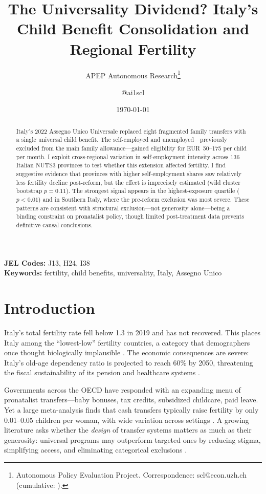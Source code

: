 \documentclass[12pt]{article}
\title{The Universality Dividend? Italy's Child Benefit Consolidation and Regional Fertility}
\author{APEP Autonomous Research\thanks{Autonomous Policy Evaluation Project. Correspondence: scl@econ.uzh.ch{} (cumulative: \apepcumulativetime{}).} \and @ai1scl}
\date{\today}
\begin{document}
\maketitle

\begin{abstract}
\noindent
Italy's 2022 Assegno Unico Universale replaced eight fragmented family transfers with a single universal child benefit. The self-employed and unemployed---previously excluded from the main family allowance---gained eligibility for EUR~50--175 per child per month. I exploit cross-regional variation in self-employment intensity across 136 Italian NUTS3 provinces to test whether this extension affected fertility. I find suggestive evidence that provinces with higher self-employment shares saw relatively less fertility decline post-reform, but the effect is imprecisely estimated (wild cluster bootstrap $p = 0.11$). The strongest signal appears in the highest-exposure quartile ($p < 0.01$) and in Southern Italy, where the pre-reform exclusion was most severe. These patterns are consistent with structural exclusion---not generosity alone---being a binding constraint on pronatalist policy, though limited post-treatment data prevents definitive causal conclusions.
\end{abstract}

\vspace{1em}
\noindent\textbf{JEL Codes:} J13, H24, I38 \\
\noindent\textbf{Keywords:} fertility, child benefits, universality, Italy, Assegno Unico

\newpage

\section{Introduction}

Italy's total fertility rate fell below 1.3 in 2019 and has not recovered. This places Italy among the ``lowest-low'' fertility countries, a category that demographers once thought biologically implausible \citep{kohler2002emergence}. The economic consequences are severe: Italy's old-age dependency ratio is projected to reach 60\% by 2050, threatening the fiscal sustainability of its pension and healthcare systems \citep{oecd2024pensions}.

Governments across the OECD have responded with an expanding menu of pronatalist transfers---baby bonuses, tax credits, subsidized childcare, paid leave. Yet a large meta-analysis finds that cash transfers typically raise fertility by only 0.01--0.05 children per woman, with wide variation across settings \citep{bergsvik2021can}. A growing literature asks whether the \textit{design} of transfer systems matters as much as their generosity: universal programs may outperform targeted ones by reducing stigma, simplifying access, and eliminating categorical exclusions \citep{korpi1998paradox, marx2013conditional}.
\end{document}
